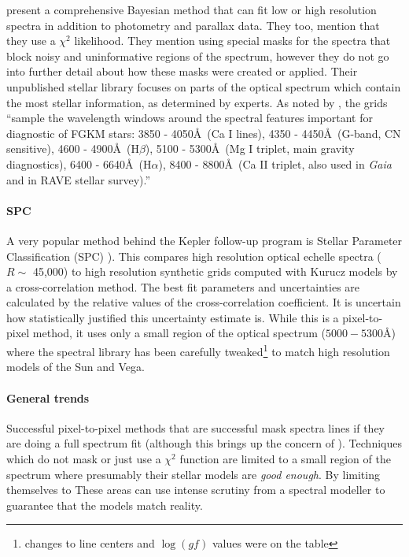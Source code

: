 \documentclass[preprint]{aastex} %
\begin{document}
\citet{sb13} present a comprehensive Bayesian method that can fit low or high resolution spectra in addition to photometry and parallax data. They too, mention that they use a $\chi^2$ likelihood. They mention using special masks for the spectra that block noisy and uninformative regions of the spectrum, however they do not go into further detail about how these masks were created or applied. Their unpublished stellar library focuses on parts of the optical spectrum which contain the most stellar information, as determined by experts. As noted by \citet{sb13}, the grids ``sample the wavelength windows around the spectral features important for diagnostic of FGKM stars: 3850 - 4050\AA\ (Ca I lines), 4350 - 4450\AA\ (G-band, CN sensitive), 4600 - 4900\AA\ (H$\beta$), 5100 - 5300\AA\ (Mg I triplet, main gravity diagnostics), 6400 - 6640\AA\ (H$\alpha$), 8400 - 8800\AA\ (Ca II triplet, also used in \emph{Gaia} and in RAVE stellar survey).'' 

\paragraph{SPC} A very popular method behind the Kepler follow-up program is Stellar Parameter Classification (SPC) \citep{blj+12}). This compares high resolution optical echelle spectra ($R \sim$ 45,000) to high resolution synthetic grids computed with Kurucz models by a cross-correlation method. The best fit parameters and uncertainties are calculated by the relative values of the cross-correlation coefficient. It is uncertain how statistically justified this uncertainty estimate is. While this is a pixel-to-pixel method, it uses only a small region of the optical spectrum ($5000 - 5300$\AA) where the spectral library has been carefully tweaked\footnote{changes to line centers and $\log(gf)$ values were on the table} to match  high resolution models of the Sun and Vega. 

\paragraph{General trends}
Successful pixel-to-pixel methods that are successful mask spectra lines if they are doing a full spectrum fit (although this brings up the concern of \citet{mga13}). Techniques which do not mask or just use a $\chi^2$ function are limited to a small region of the spectrum where presumably their stellar models are \emph{good enough}.
By limiting themselves to These areas can use intense scrutiny from a spectral modeller to guarantee that the models match reality.
\end{document}
